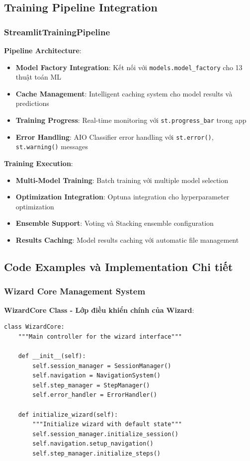 \subsection{Training Pipeline Integration}\label{subsec:training-integration}

\subsubsection{StreamlitTrainingPipeline}

\textbf{Pipeline Architecture}:
\begin{itemize}
    \item \textbf{Model Factory Integration}: Kết nối với \texttt{models.model\_factory} cho 13 thuật toán ML
    \item \textbf{Cache Management}: Intelligent caching system cho model results và predictions
    \item \textbf{Training Progress}: Real-time monitoring với \texttt{st.progress\_bar} trong app
    \item \textbf{Error Handling}: AIO Classifier error handling với \texttt{st.error()}, \texttt{st.warning()} messages
\end{itemize}

\textbf{Training Execution}:
\begin{itemize}
    \item \textbf{Multi-Model Training}: Batch training với multiple model selection
    \item \textbf{Optimization Integration}: Optuna integration cho hyperparameter optimization
    \item \textbf{Ensemble Support}: Voting và Stacking ensemble configuration
    \item \textbf{Results Caching}: Model results caching với automatic file management
\end{itemize}

\subsection{Code Examples và Implementation Chi tiết}

\subsubsection{Wizard Core Management System}

\textbf{WizardCore Class - Lớp điều khiển chính của Wizard}:

\begin{verbatim}
class WizardCore:
    """Main controller for the wizard interface"""
    
    def __init__(self):
        self.session_manager = SessionManager()
        self.navigation = NavigationSystem()
        self.step_manager = StepManager()
        self.error_handler = ErrorHandler()
        
    def initialize_wizard(self):
        """Initialize wizard with default state"""
        self.session_manager.initialize_session()
        self.navigation.setup_navigation()
        self.step_manager.initialize_steps()
\end{verbatim}

